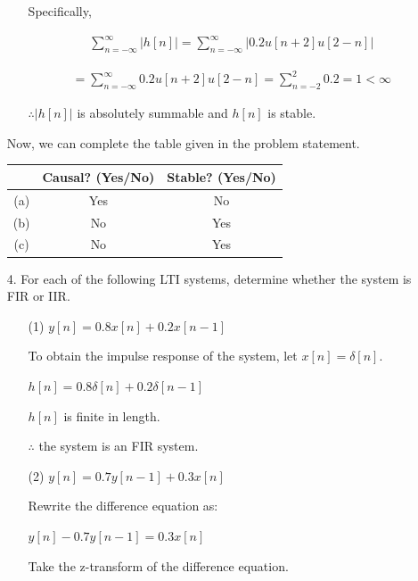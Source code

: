 \documentclass[fleqn]{article}
\begin{document}
\begin{enumerate}[nolistsep]
\begin{enumerate}[nolistsep]
					Specifically,
					
					\begin{align*}
						\sum_{n=-\infty}^{\infty}{|h[n]|} = \sum_{n=-\infty}^{\infty}{|0.2u[n+2]u[2-n]|}
					\end{align*}
					
					\begin{align*}
						 = \sum_{n=-\infty}^{\infty}{0.2u[n+2]u[2-n]} = \sum_{n=-2}^{2}{0.2} = 1 < \infty
					\end{align*}
					
					$\therefore |h[n]|$ is absolutely summable and $h[n]$ is stable.
			\end{enumerate}
			
			Now, we can complete the table given in the problem statement.
			
			\begin{center}
				\begin{tabular}{|c|c|c|}
					\hline
					& Causal? (Yes/No) & Stable? (Yes/No) \\
					\hline
					(a) & Yes & No \\
					\hline
					(b) & No & Yes \\
					\hline
					(c) & No & Yes \\
					\hline
				\end{tabular}
			\end{center}
			
		\item[4.] For each of the following LTI systems, determine whether the system is FIR or IIR.
		
			\begin{enumerate}[nolistsep]
			
				\item[(1)] $y[n] = 0.8x[n] + 0.2x[n-1]$
				
				To obtain the impulse response of the system, let $x[n] = \delta[n]$.
				
				$h[n] = 0.8\delta[n] + 0.2\delta[n-1]$
				
				$h[n]$ is finite in length.
				
				$\therefore$ the system is an FIR system.
				
				\item[(2)] $y[n] = 0.7y[n-1] + 0.3x[n]$
				
				Rewrite the difference equation as:
				
				$y[n] - 0.7y[n-1] = 0.3x[n]$
				
				Take the z-transform of the difference equation.
				

\end{enumerate}
\end{enumerate}
\end{document}
